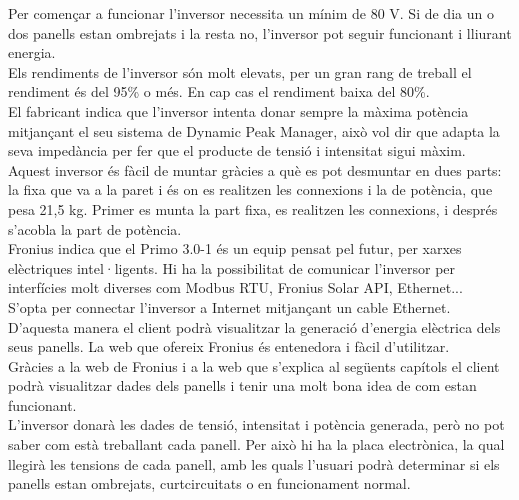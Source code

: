 \noindent Per començar a funcionar l'inversor necessita un mínim de 80 V. Si de dia un o dos panells estan ombrejats i la resta no, l'inversor pot seguir funcionant i lliurant energia.\\
\newline Els rendiments de l'inversor són molt elevats, per un gran rang de treball el rendiment és del 95\% o més. En cap cas el rendiment baixa del 80\%.\\
\newline El fabricant indica que l'inversor intenta donar sempre la màxima potència mitjançant el seu sistema de Dynamic Peak Manager, això vol dir que adapta la seva impedància per fer que el producte de tensió i intensitat sigui màxim.\\
\newline Aquest inversor és fàcil de muntar gràcies a què es pot desmuntar en dues parts: la fixa que va a la paret i és on es realitzen les connexions i la de potència, que pesa 21,5 kg. Primer es munta la part fixa, es realitzen les connexions, i després s'acobla la part de potència.\\
\newline Fronius indica que el Primo 3.0-1 és un equip pensat pel futur, per xarxes elèctriques intel·ligents. Hi ha la possibilitat de comunicar l'inversor per interfícies molt diverses com Modbus RTU, Fronius Solar API, Ethernet...\\
\newline S'opta per connectar l'inversor a Internet mitjançant un cable Ethernet. D'aquesta manera el client podrà visualitzar la generació d'energia elèctrica dels seus panells. La web que ofereix Fronius és entenedora i fàcil d'utilitzar.\\
\newline Gràcies a la web de Fronius i a la web que s'explica al següents capítols el client podrà visualitzar dades dels panells i tenir una molt bona idea de com estan funcionant.\\
\newline L'inversor donarà les dades de tensió, intensitat i potència generada, però no pot saber com està treballant cada panell. Per això hi ha la placa electrònica, la qual llegirà les tensions de cada panell, amb les quals l'usuari podrà determinar si els panells estan ombrejats, curtcircuitats o en funcionament normal.




\clearpage


